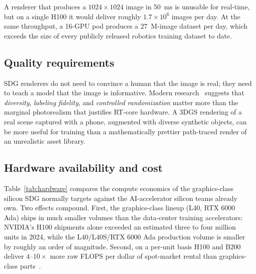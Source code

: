 \documentclass[10pt,journal]{IEEEtran}
\begin{document}
A renderer that produces a $1024{\times}1024$ image in 50~ms is
unusable for real-time, but on a single H100 it would deliver roughly
$1.7{\times}10^6$ images per day. At the same throughput, a 16-GPU pod
produces a 27~M-image dataset per day, which exceeds the size of every
publicly released robotics training dataset to date.

\subsection{Quality requirements}

SDG renderers do not need to convince a human that the image is real;
they need to teach a model that the image is informative. Modern
research~\cite{tobin2017domain,nvidia2024cosmos} suggests that
\emph{diversity}, \emph{labeling fidelity}, and \emph{controlled
randomization} matter more than the marginal photorealism that justifies
RT-core hardware. A 3DGS rendering of a real scene captured with a
phone, augmented with diverse synthetic objects, can be more useful for
training than a mathematically prettier path-traced render of an
unrealistic asset library.

\subsection{Hardware availability and cost}

Table~\ref{tab:hardware} compares the compute economics of the
graphics-class silicon SDG normally targets against the AI-accelerator
silicon teams already own. Two effects compound. First, the
graphics-class lineup (L40, RTX 6000 Ada) ships in much smaller
volumes than the data-center training accelerators: NVIDIA's H100
shipments alone exceeded an estimated three to four million units in
2024, while the L40\slash L40S\slash RTX 6000 Ada production volume is
smaller by roughly an order of magnitude. Second, on a per-unit basis
H100 and B200 deliver $4$--$10{\times}$ more raw FLOPS per dollar of
spot-market rental than graphics-class
parts~\cite{nvidia-hopper-h100,nvidia-blackwell-b200}.
\end{document}

